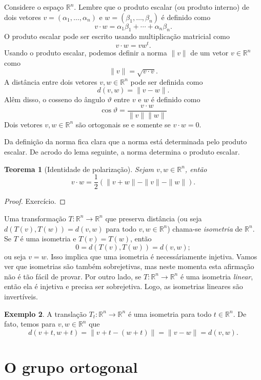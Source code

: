 \documentclass[12pt]{amsart}
\newcommand{\R}{\mathbb R}
\newtheorem{theorem}{Teorema}
\theoremstyle{definition}
\newtheorem{example}[theorem]{Exemplo}
\begin{document}
Considere o espaço $\R^n$. Lembre que o produto escalar (ou produto interno) de dois vetores 
$v=(\alpha_1,\ldots,\alpha_n)$ e $w=(\beta_1,\ldots,\beta_n)$ é definido como 
\[
    v\cdot w=\alpha_1\beta_1+\cdots+\alpha_n\beta_n.
\]
O produto escalar pode ser escrito usando multiplicação matricial como 
\[
    v\cdot w=vw^t.
\]
Usando o produto escalar, podemos definir a norma $\|v\|$ de um vetor $v\in\R^n$ como
\[
    \|v\|=\sqrt{v\cdot v}.
\] 
A distância entre dois vetores $v,w\in \R^n$ pode ser definida como 
\[
    d(v,w)=\|v-w\|.
\]
Alêm disso, o cosseno do ângulo $\vartheta$ entre $v$ e $w$ é definido como 
\[
    \cos\vartheta=\frac{v\cdot w}{\|v\|\|w\|}
\]
Dois vetores $v,w\in \R^n$ são ortogonais se e somente se $v\cdot w=0$.

Da definição da norma fica clara que a norma está determinada pelo produto escalar. De acrodo do lema seguinte, 
a norma determina o produto escalar.

\begin{theorem}[Identidade de polarização]   Sejam $v,w\in \R^n$, então 
    \[
        v\cdot w=\frac 12\left(\|v+w\|-\|v\|-\|w\|\right).
\]
\end{theorem}
\begin{proof}
    Exercício.
\end{proof}

Uma transformação $T:\R^n\to\R^n$ que preserva distância (ou seja $d(T(v),T(w))=d(v,w)$ para 
todo $v,w\in \R^n$) chama-se \emph{isometria} de $\R^n$. Se $T$ é uma isometria e $T(v)=T(w)$, então 
\[
    0=d(T(v),T(w))=d(v,w);
\]
ou seja $v=w$. Isso implica que uma isometria é necessáriamente injetiva. Vamos ver que isometrias são 
também sobrejetivas, mas neste momenta esta afirmação não é tão fácil de provar. Por outro lado, se 
$T:\R^n\to\R^n$ é  uma isometria \emph{linear}, então ela é injetiva e precisa ser sobrejetiva. Logo, as 
isometrias lineares são invertíveis.

\begin{example}
    A translação $T_t:\R^n\to \R^n$ é uma isometria para todo $t\in\R^n$. De fato, temos 
    para $v,w\in\R^n$ que 
    \[
        d(v+t,w+t)=\|v+t-(w+t)\|=\|v-w\|=d(v,w).
    \]
\end{example}

\section{O grupo ortogonal}
\end{document}
